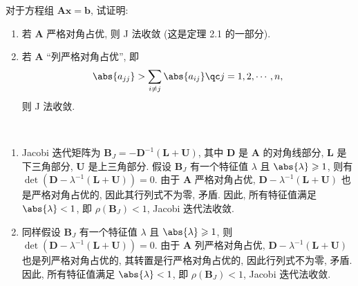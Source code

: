 \documentclass[lang = zh]{iwork}
\begin{document}
\begin{prob}
  对于方程组 $\bm{A} \bm{x} = \bm{b}$, 试证明:
  \begin{enumerate}
    \item 若 $\bm{A}$ 严格对角占优, 则 J 法收敛 (这是定理 2.1 的一部分).
    \item 若 $\bm{A}$ ``列严格对角占优'', 即
          \begin{equation*}
            \abs{a_{jj}} > \sum_{i \neq j} \abs{a_{ij}} \qc
            j = 1, 2, \cdots, n,
          \end{equation*}
          则 J 法收敛.
  \end{enumerate}
\end{prob}
\begin{sol} ~
  \begin{enumerate}
    \item Jacobi 迭代矩阵为 $\bm{B}_J = -\bm{D}^{-1}(\bm{L} + \bm{U})$, 其中 $\bm{D}$ 是 $\bm{A}$ 的对角线部分, $\bm{L}$ 是下三角部分, $\bm{U}$ 是上三角部分.
          假设 $\bm{B}_J$ 有一个特征值 $\lambda$ 且 $\abs{\lambda} \geqslant 1$, 则有 $\det(\bm{D} - \lambda^{-1}(\bm{L} + \bm{U})) = 0$.
          由于 $\bm{A}$ 严格对角占优, $\bm{D} - \lambda^{-1}(\bm{L} + \bm{U})$ 也是严格对角占优的, 因此其行列式不为零, 矛盾.
          因此, 所有特征值满足 $\abs{\lambda} < 1$, 即 $\rho(\bm{B}_J) < 1$, Jacobi 迭代法收敛.
    \item 同样假设 $\bm{B}_J$ 有一个特征值 $\lambda$ 且 $\abs{\lambda} \geqslant 1$, 则 $\det(\bm{D} - \lambda^{-1}(\bm{L} + \bm{U})) = 0$.
          由于 $\bm{A}$ 列严格对角占优, $\bm{D} - \lambda^{-1}(\bm{L} + \bm{U})$ 也是列严格对角占优的, 其转置是行严格对角占优的, 因此行列式不为零, 矛盾.
          因此, 所有特征值满足 $\abs{\lambda} < 1$, 即 $\rho(\bm{B}_J) < 1$, Jacobi 迭代法收敛.
  \end{enumerate}
\end{sol}
\end{document}
